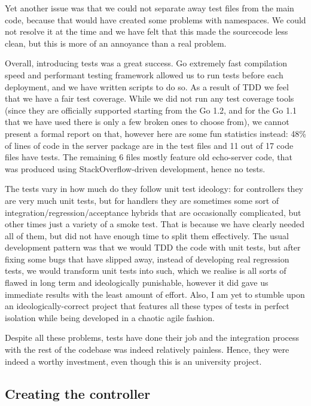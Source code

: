 \documentclass{l3proj}
\begin{document}
Yet another issue was that we could not separate away test files from the main code, because that would have created some problems with namespaces. We could not resolve it at the time and we have felt that this made the sourcecode less clean, but this is more of an annoyance than a real problem.

Overall, introducing tests was a great success. Go extremely fast compilation speed and performant testing framework allowed us to run tests before each deployment, and we have written scripts to do so. As a result of TDD we feel that we have a fair test coverage. While we did not run any test coverage tools (since they are officially supported starting from the Go 1.2, and for the Go 1.1 that we have used there is only a few broken ones to choose from), we cannot present a formal report on that, however here are some fun statistics instead: 48\% of lines of code in the server package are in the test files and 11 out of 17 code files have tests. The remaining 6 files mostly feature old echo-server code, that was produced using StackOverflow-driven development, hence no tests. 

The tests vary in how much do they follow unit test ideology: for controllers they are very much unit tests, but for handlers they are sometimes some sort of integration/regression/acceptance hybrids that are occasionally complicated, but other times just a variety of a smoke test. That is because we have clearly needed all of them, but did not have enough time to split them effectively. The usual development pattern was that we would TDD the code with unit tests, but after fixing some bugs that have slipped away, instead of developing real regression tests, we would transform unit tests into such, which we realise is all sorts of flawed in long term and ideologically punishable, however it did gave us immediate results with the least amount of effort. Also, I am yet to stumble upon an ideologically-correct project that features all these types of tests in perfect isolation while being developed in a chaotic agile fashion.

Despite all these problems, tests have done their job and the integration process with the rest of the codebase was indeed relatively painless. Hence, they were indeed a worthy investment, even though this is an university project.

\subsection{Creating the controller}
\end{document}
